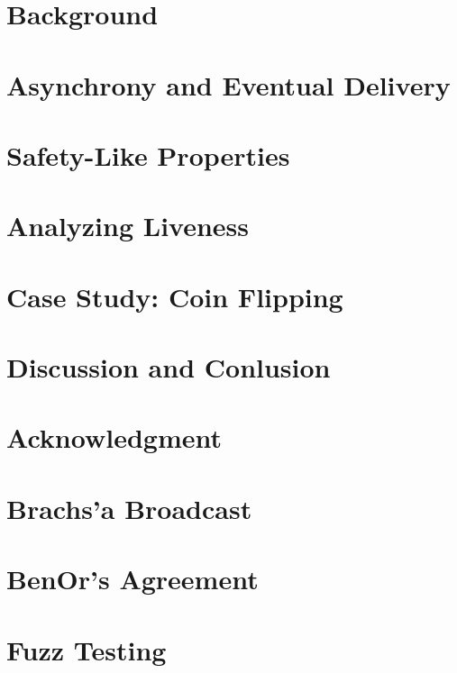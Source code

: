 \documentclass[conference]{IEEEtran}
\begin{document}
\section{Background} \label{sec:background}


\section{Asynchrony and Eventual Delivery} \label{sec:wrappers}


%

\section{Safety-Like Properties}


\section{Analyzing Liveness}


\section{Case Study: Coin Flipping}


\section{Discussion and Conlusion}


\section{Acknowledgment}





\newpage

\appendix

\section{Brachs'a Broadcast}
%

\section{BenOr's Agreement}
%

%
\section{Fuzz Testing}


\end{document}
